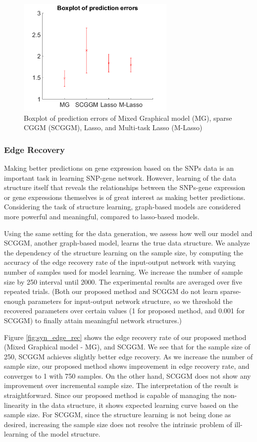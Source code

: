 \documentclass{article}
\begin{document}
\begin{figure}[h!]
  \centering
  \label{fig:pred_errbar}
  \includegraphics[width=3in]{figure/PredErr_errorbar.png}
  \caption[] {Boxplot of prediction errors of Mixed Graphical model (MG), sparse CGGM (SCGGM), Lasso, and Multi-task Lasso (M-Lasso)}
\end{figure}




\subsubsection{Edge Recovery}
Making better predictions on gene expression based on the SNPs data is an important task in learning SNP-gene network. However, learning of the data structure itself that reveals the relationships between the SNPs-gene expression or gene expressions themselves is of great interest as making better predictions. Considering the task of structure learning, graph-based models are considered more powerful and meaningful, compared to lasso-based models.

Using the same setting for the data generation, we assess how well our model and SCGGM, another graph-based model, learns the true data structure.
We analyze the dependency of the structure learning on the sample size, by computing the accuracy of the edge recovery rate of the input-output network with varying number of samples used for model learning.
We increase the number of sample size by 250 interval until 2000.
The experimental results are averaged over five repeated trials.
(Both our proposed method and SCGGM do not learn sparse-enough parameters for input-output network structure, so we threshold the recovered parameters over certain values (1 for proposed method, and 0.001 for SCGGM) to finally attain meaningful network structures.)

Figure \ref{fig:syn_edge_rec} shows the edge recovery rate of our proposed method (Mixed Graphical model - MG), and SCGGM.
We see that for the sample size of 250, SCGGM achieves slightly better edge recovery. 
As we increase the number of sample size, our proposed method shows improvement in edge recovery rate, and converges to 1 with 750 samples. 
On the other hand, SCGGM does not show any improvement over incremental sample size.
The interpretation of the result is straightforward.
Since our proposed method is capable of managing the non-linearity in the data structure, it shows expected learning curve based on the sample size.
For SCGGM, since the structure learning is not being done as desired, increasing the sample size does not resolve the intrinsic problem of ill-learning of the model structure.
\end{document}
